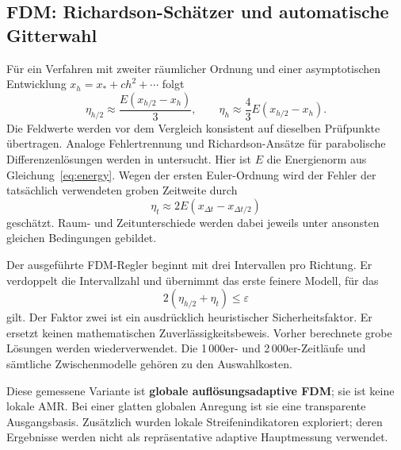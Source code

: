 \documentclass[11pt,a4paper]{article}
\begin{document}
\subsection{FDM: Richardson-Schätzer und automatische Gitterwahl}
Für ein Verfahren mit zweiter räumlicher Ordnung und einer asymptotischen Entwicklung $x_h=x_*+ch^2+\cdots$ folgt
\begin{equation}
 \eta_{h/2}\approx\frac{E(x_{h/2}-x_h)}{3},\qquad
 \eta_h\approx\frac43E(x_{h/2}-x_h).
\end{equation}
Die Feldwerte werden vor dem Vergleich konsistent auf dieselben Prüfpunkte übertragen. Analoge Fehlertrennung und Richardson-Ansätze für parabolische Differenzenlösungen werden in \cite{debrabant} untersucht. Hier ist $E$ die Energienorm aus Gleichung~\eqref{eq:energy}. Wegen der ersten Euler-Ordnung wird der Fehler der tatsächlich verwendeten groben Zeitweite durch
\begin{equation}
 \eta_t\approx 2E(x_{\Delta t}-x_{\Delta t/2})
\end{equation}
geschätzt. Raum- und Zeitunterschiede werden dabei jeweils unter ansonsten gleichen Bedingungen gebildet.

Der ausgeführte FDM-Regler beginnt mit drei Intervallen pro Richtung. Er verdoppelt die Intervallzahl und übernimmt das erste feinere Modell, für das
\begin{equation}\label{eq:fdmstop}
 2(\eta_{h/2}+\eta_t)\le\varepsilon
\end{equation}
gilt. Der Faktor zwei ist ein ausdrücklich heuristischer Sicherheitsfaktor. Er ersetzt keinen mathematischen Zuverlässigkeitsbeweis. Vorher berechnete grobe Lösungen werden wiederverwendet. Die 1\,000er- und 2\,000er-Zeitläufe und sämtliche Zwischenmodelle gehören zu den Auswahlkosten.

Diese gemessene Variante ist \textbf{globale auflösungsadaptive FDM}; sie ist keine lokale AMR. Bei einer glatten globalen Anregung ist sie eine transparente Ausgangsbasis. Zusätzlich wurden lokale Streifenindikatoren exploriert; deren Ergebnisse werden nicht als repräsentative adaptive Hauptmessung verwendet.
\end{document}
